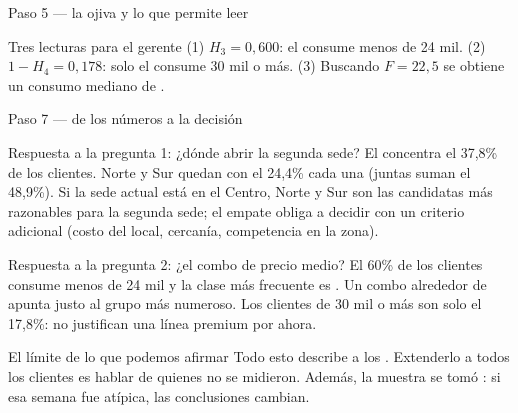 \documentclass[aspectratio=169,10pt]{beamer}
\begin{document}
\begin{frame}{Paso 5 — la ojiva y lo que permite leer}
  \centering

  \vspace{-0.05cm}
  \begin{alertblock}{Tres lecturas para el gerente}
    \scriptsize
    (1) $H_3 = 0{,}600$: el  consume menos de 24 mil. \quad
    (2) $1-H_4 = 0{,}178$: solo el  consume 30 mil o más.
    \quad (3) Buscando $F = 22{,}5$ se obtiene un consumo mediano de
    .
  \end{alertblock}
\end{frame}

\begin{frame}{Paso 7 — de los números a la decisión}
  \begin{block}{Respuesta a la pregunta 1: ¿dónde abrir la segunda sede?}
    \scriptsize
    El  concentra el 37,8\% de los clientes. Norte y Sur quedan
     con el 24,4\% cada una (juntas suman el 48,9\%).
    Si la sede actual está en el Centro, Norte y Sur son las candidatas más
    razonables para la segunda sede; el empate obliga a decidir con un
    criterio adicional (costo del local, cercanía, competencia en la zona).
  \end{block}

  \vspace{0.1cm}
  \begin{block}{Respuesta a la pregunta 2: ¿el combo de precio medio?}
    \scriptsize
    El 60\% de los clientes consume menos de 24 mil y la clase más frecuente
    es \azul{$[18, 24)$}. Un combo alrededor de  apunta
    justo al grupo más numeroso. Los clientes de 30 mil o más son solo el
    17,8\%: no justifican una línea premium por ahora.
  \end{block}

  \vspace{0.1cm}
  \begin{alertblock}{El límite de lo que podemos afirmar}
    \scriptsize
    Todo esto describe a los . Extenderlo a todos los
    clientes es hablar de quienes no se midieron. Además, la muestra se tomó
    :
    si esa semana fue atípica, las conclusiones cambian.
  \end{alertblock}
\end{frame}
\end{document}
